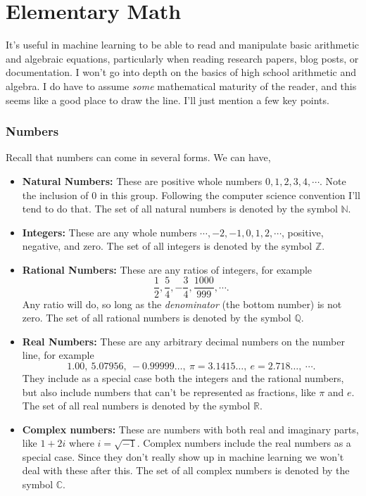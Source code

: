 \documentclass[
  letterpaper,
  DIV=11,
  numbers=noendperiod]{scrreprt}
\providecommand{\tightlist}{%
  \setlength{\itemsep}{0pt}\setlength{\parskip}{0pt}}\usepackage{longtable,booktabs,array}
\begin{document}
\hypertarget{elementary-math}{%
\section{Elementary Math}\label{elementary-math}}

It's useful in machine learning to be able to read and manipulate basic
arithmetic and algebraic equations, particularly when reading research
papers, blog posts, or documentation. I won't go into depth on the
basics of high school arithmetic and algebra. I do have to assume
\emph{some} mathematical maturity of the reader, and this seems like a
good place to draw the line. I'll just mention a few key points.

\hypertarget{numbers}{%
\subsubsection{Numbers}\label{numbers}}

Recall that numbers can come in several forms. We can have,

\begin{itemize}
\tightlist
\item
  \textbf{Natural Numbers:} These are positive whole numbers
  \(0, 1, 2, 3, 4, \cdots\). Note the inclusion of \(0\) in this group.
  Following the computer science convention I'll tend to do that. The
  set of all natural numbers is denoted by the symbol \(\mathbb{N}\).
\item
  \textbf{Integers:} These are any whole numbers
  \(\cdots, -2, -1, 0, 1, 2, \cdots\), positive, negative, and zero. The
  set of all integers is denoted by the symbol \(\mathbb{Z}\).
\item
  \textbf{Rational Numbers:} These are any ratios of integers, for
  example
  \[\frac{1}{2}, \frac{5}{4}, -\frac{3}{4}, \frac{1000}{999}, \cdots.\]
  Any ratio will do, so long as the \emph{denominator} (the bottom
  number) is not zero. The set of all rational numbers is denoted by the
  symbol \(\mathbb{Q}\).
\item
  \textbf{Real Numbers:} These are any arbitrary decimal numbers on the
  number line, for example
  \[1.00, \ 5.07956, \ -0.99999\dots, \ \pi=3.1415\dots, \ e=2.718\dots, \ \cdots.\]
  They include as a special case both the integers and the rational
  numbers, but also include numbers that can't be represented as
  fractions, like \(\pi\) and \(e\). The set of all real numbers is
  denoted by the symbol \(\mathbb{R}\).
\item
  \textbf{Complex numbers:} These are numbers with both real and
  imaginary parts, like \(1 + 2i\) where \(i=\sqrt{-1}\). Complex
  numbers include the real numbers as a special case. Since they don't
  really show up in machine learning we won't deal with these after
  this. The set of all complex numbers is denoted by the symbol
  \(\mathbb{C}\).
\end{itemize}
\end{document}
